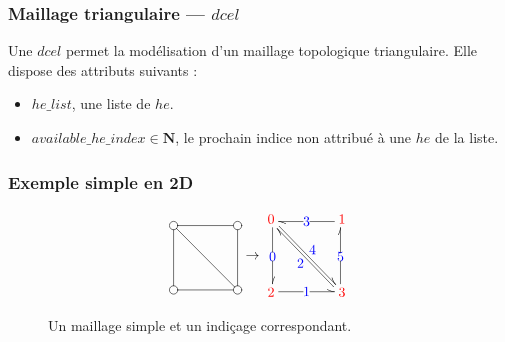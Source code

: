\documentclass[]{article}
\begin{document}
\subsubsection*{Maillage triangulaire — $dcel$}
Une $dcel$ permet la modélisation d'un maillage topologique triangulaire. Elle dispose des attributs suivants :
\begin{itemize}
	\item $he\_list$, une liste de $he$.
	\item $available\_he\_index \in \mathbf{N}$, le prochain indice non attribué à une $he$ de la liste.
\end{itemize}

\subsubsection*{Exemple simple en 2D}

\begin{figure}[H]
	\[\begin{aligned}[c]
			\entrymodifiers={+[o][F]}
			\renewcommand{\labelstyle}{\textstyle}
			\xymatrix@=4em @L=.25ex{
			{}
			\ar @^{-} [d]
			\ar @^{-} [dr]
			 & {}
			\ar @^{-} [l]
			\\ {}
			\ar @^{-} [r]
			 & {}
			\ar @^{-} [u]
			}
		\end{aligned}\rightarrow\begin{aligned}[c]
			\xymatrix@=4em @L=.25ex{
			{\color{red}0}
			\ar @<.25ex> @^{->} [d] |{\color{blue}0}
			\ar @<.25ex> @^{->} [dr] ^{\color{blue}4}
			 & {\color{red}1}
			\ar @<.25ex> @^{->} [l] |{\color{blue}3}
			\\ {\color{red}2}
			\ar @<.25ex> @^{->} [r] |{\color{blue}1}
			 & {\color{red}3}
			\ar @<.25ex> @^{->} [ul] ^{\color{blue}2}
			\ar @<.25ex> @^{->} [u] |{\color{blue}5}
			}
		\end{aligned}\]
	\caption{Un maillage simple et un indiçage correspondant.}
	\label{maillage_simple}
\end{figure}
\end{document}
